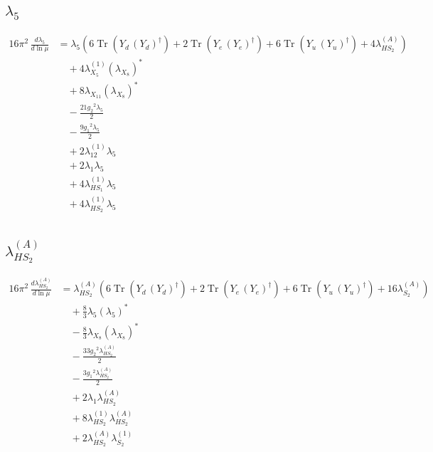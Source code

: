 \documentclass[10pt,a4paper]{article}
\begin{document}
\subsection*{$\lambda_5$}
\begin{align*}
16\pi^2\,\frac{d \lambda_5}{d\ln\mu} &={\lambda_5} (6 \operatorname{Tr}\!\left({Y_d}\,\left({Y_d}\right)^{\dagger}\right)+2 \operatorname{Tr}\!\left({Y_e}\,\left({Y_e}\right)^{\dagger}\right)+6 \operatorname{Tr}\!\left({Y_u}\,\left({Y_u}\right)^{\dagger}\right)+4 {\lambda_{HS_2}^{(A)}}) \\
&\quad +4 {\lambda_{X_{5}}^{(1)}} \left({\lambda_{X_{8}}}\right)^{*} \\
&\quad +8 {\lambda_{X_{11}}} \left({\lambda_{X_{8}}}\right)^{*} \\
&\quad -\frac{21 {g_2}^2 {\lambda_5}}{2} \\
&\quad -\frac{9 {g_1}^2 {\lambda_5}}{2} \\
&\quad +2 {\lambda_{12}^{(1)}} {\lambda_5} \\
&\quad +2 {\lambda_1} {\lambda_5} \\
&\quad +4 {\lambda_{HS_1}^{(1)}} {\lambda_5} \\
&\quad +4 {\lambda_{HS_2}^{(1)}} {\lambda_5} \\
\end{align*}
\subsection*{$\lambda_{HS_2}^{(A)}$}
\begin{align*}
16\pi^2\,\frac{d \lambda_{HS_2}^{(A)}}{d\ln\mu} &={\lambda_{HS_2}^{(A)}} (6 \operatorname{Tr}\!\left({Y_d}\,\left({Y_d}\right)^{\dagger}\right)+2 \operatorname{Tr}\!\left({Y_e}\,\left({Y_e}\right)^{\dagger}\right)+6 \operatorname{Tr}\!\left({Y_u}\,\left({Y_u}\right)^{\dagger}\right)+16 {\lambda_{S_2}^{(A)}}) \\
&\quad +\frac{8}{3} {\lambda_5} \left({\lambda_5}\right)^{*} \\
&\quad -\frac{8}{3} {\lambda_{X_{8}}} \left({\lambda_{X_{8}}}\right)^{*} \\
&\quad -\frac{33 {g_2}^2 {\lambda_{HS_2}^{(A)}}}{2} \\
&\quad -\frac{3 {g_1}^2 {\lambda_{HS_2}^{(A)}}}{2} \\
&\quad +2 {\lambda_1} {\lambda_{HS_2}^{(A)}} \\
&\quad +8 {\lambda_{HS_2}^{(1)}} {\lambda_{HS_2}^{(A)}} \\
&\quad +2 {\lambda_{HS_2}^{(A)}} {\lambda_{S_2}^{(1)}} \\
\end{align*}
\end{document}
